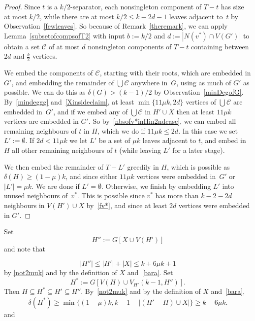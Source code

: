 \documentclass[12pt]{article}
\begin{document}
\begin{proof}
 Since $t$ is a $k/2$-separator, each nonsingleton component of $T-t$ has size at most $k/2$, while there are at most $k/2\le k-2d-1$ leaves adjacent to~$t$ by Observation~\ref{fewleaves}. So because of Remark~\ref{theremark}, we can apply Lemma~\ref{subsetofcompsofT2}   with input $b:=k/2$ and $d:=|N(v^*)\cap V(G')|$   to obtain a set $\mathcal C$ of at most $d$ nonsingleton components of $T-t$ containing between $2d$ and $\frac{k}{2}$ vertices.
 
We embed the components of $\mathcal C$, starting with their roots, which are embedded in $G'$, and embedding the remainder of $\bigcup\mathcal C$ anywhere  in~$G$, using as much of $G'$ as possible.
 We can do this as $\delta(G)> (k-1)/2$ by Observation~\ref{minDegofG}. By~\eqref{mindeggg} and~\eqref{Xinsideclaim},   at least $\min\{11\mu k, 2d\}$ vertices of $\bigcup\mathcal C$ are embedded in~$G'$, and if we embed any  of $\bigcup\mathcal C$
 in $H' \cup X$ then at least $11\mu k$ vertices are embedded in $G'$.
 So by~\eqref{nbsofv*inHin2ndcase}, we can embed all remaining neighbours of $t$ in $H$, which we do if $11\mu k\le 2d$. In this case we set $L':=\emptyset$. If $2d<11\mu k$ we let $L'$ be a set  of $\mu k$ leaves adjacent to $t$, and
  embed in $H$ all other  remaining neighbours of $t$ (while leaving $L'$ for a later stage). 

 
We then embed the  remainder of $T-L'$ greedily  in $H$, which is possible as $\delta(H)\ge (1-\mu)k$, and since either $11\mu k$ vertices were embedded in~$G'$ or $|L'|=\mu k$. We are done if  $L'=\emptyset$. Otherwise,
 we finish by embedding $L'$  into unused neighbours of~$v^*$. This is possible since $v^*$ has more than $k-2-2d$ neighbours in  $V(H')\cup X$ by~\eqref{fv*},
 and since  at least $2d$ vertices were embedded in $G'$.   
          \end{proof}
          
  

 
     Set     
          $$H'':=G[X\cup V(H')]$$ and note that 
          
\begin{equation}\label{H'''}
|H''|\le |H'|+|X|  
\le k+6\mu k+1
\end{equation}
 by \eqref{not2muk}  and by the definition of $X$ and~\eqref{bara}. 
Set $$H^*:=G[V(H)\cup V_{H'}(k-1, H'')].$$
Then $H\subseteq H^*\subseteq H'\subseteq H''.$
By~\eqref{not2muk} and by  the definition of $X$ and~\eqref{bara},
        \begin{equation}\label{H*mindeg}
       \delta(H^*)\ge 
       \min \big\{(1-\mu)k, k-1-|(H'-H)\cup X| \big\} 
       \ge  k-6\mu k.
        \end{equation}
        and
      
\end{document}
